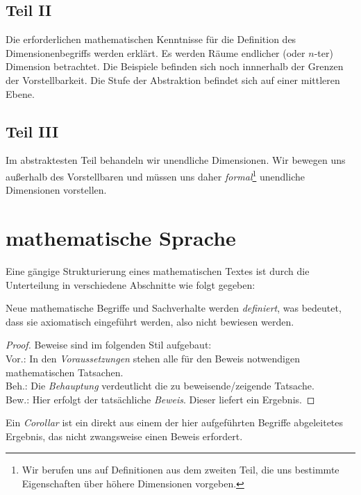 \subsection*{Teil II}
Die erforderlichen mathematischen Kenntnisse für die Definition des Dimensionenbegriffs werden erklärt. Es werden Räume endlicher (oder $n$-ter) Dimension betrachtet. Die Beispiele befinden sich noch innnerhalb der Grenzen der Vorstellbarkeit.
Die Stufe der Abstraktion befindet sich auf einer mittleren Ebene.
\subsection*{Teil III}
Im abstraktesten Teil behandeln wir unendliche Dimensionen. Wir bewegen uns außerhalb des Vorstellbaren und müssen uns daher \emph{formal}\footnote{Wir berufen uns auf Definitionen aus dem zweiten Teil, die uns bestimmte Eigenschaften über höhere Dimensionen vorgeben.} unendliche Dimensionen vorstellen.

\section{mathematische Sprache}
Eine gängige Strukturierung eines mathematischen Textes ist durch die Unterteilung in verschiedene Abschnitte wie folgt gegeben:

\theoremstyle{definition}
\begin{definition}{}
Neue mathematische Begriffe und Sachverhalte werden \emph{definiert}, was bedeutet, dass sie axiomatisch eingeführt werden, also nicht bewiesen werden.
\end{definition}

\begin{proof}
Beweise sind im folgenden Stil aufgebaut:
\\ Vor.: In den \emph{Voraussetzungen} stehen alle für den Beweis notwendigen mathematischen Tatsachen.
\\ Beh.: Die \emph{Behauptung} verdeutlicht die zu beweisende/zeigende Tatsache.
\\ Bew.: Hier erfolgt der tatsächliche \emph{Beweis}. Dieser liefert ein Ergebnis.
\end{proof}

\theoremstyle{Corollar}
\begin{Corollar}
Ein \emph{Corollar} ist ein direkt aus einem der hier aufgeführten Begriffe abgeleitetes Ergebnis, das nicht zwangsweise einen Beweis erfordert.
\end{Corollar}

